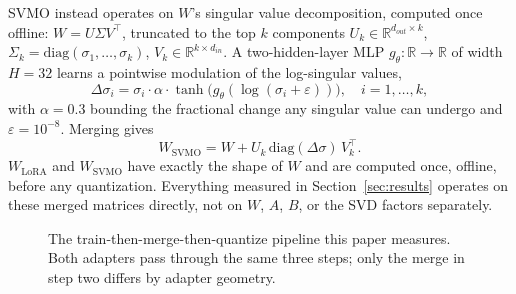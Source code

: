 \documentclass[conference]{IEEEtran}
\begin{document}
SVMO instead operates on $W$'s singular value decomposition, computed once offline: $W = U\Sigma V^\top$, truncated to the top $k$ components $U_k \in \mathbb{R}^{d_{out}\times k}$, $\Sigma_k=\mathrm{diag}(\sigma_1,\ldots,\sigma_k)$, $V_k\in\mathbb{R}^{k\times d_{in}}$. A two-hidden-layer MLP $g_\theta:\mathbb{R}\to\mathbb{R}$ of width $H=32$ learns a pointwise modulation of the log-singular values,
\begin{equation}
\Delta\sigma_i = \sigma_i\cdot\alpha\cdot\tanh\!\big(g_\theta(\log(\sigma_i+\varepsilon))\big), \quad i=1,\ldots,k,
\label{eq:svmo-delta}
\end{equation}
with $\alpha=0.3$ bounding the fractional change any singular value can undergo and $\varepsilon=10^{-8}$. Merging gives
\begin{equation}
W_{\text{SVMO}} = W + U_k\,\mathrm{diag}(\Delta\sigma)\,V_k^\top.
\label{eq:svmo-merge}
\end{equation}
$W_{\text{LoRA}}$ and $W_{\text{SVMO}}$ have exactly the shape of $W$ and are computed once, offline, before any quantization. Everything measured in Section~\ref{sec:results} operates on these merged matrices directly, not on $W$, $A$, $B$, or the SVD factors separately.

\begin{figure}[t]
\centering
{}
\caption{The train-then-merge-then-quantize pipeline this paper measures. Both adapters pass through the same three steps; only the merge in step two differs by adapter geometry.}
\label{fig:pipeline}
\end{figure}
\end{document}

